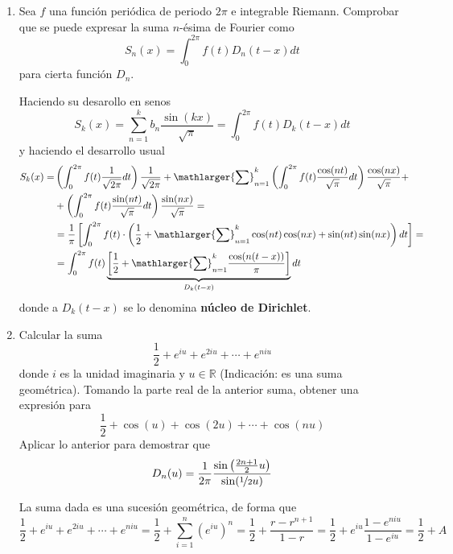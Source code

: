 \begin{enumerate}
    \item Sea $f$ una función periódica de periodo $2\pi$ e integrable Riemann. Comprobar que se puede expresar la suma $n$-ésima de Fourier como $$S_n(x) = \int_0^{2\pi} f(t) D_n(t - x) dt$$ para cierta función $D_n$.
    \begin{sol}
        Haciendo su desarollo en senos
        $$S_k(x)=\sum_{n=1}^k b_n \dfrac{\sin(kx)}{\sqrt{\pi}}=\int_0^{2\pi} f(t) D_k(t-x) dt$$
        y haciendo el desarrollo usual
        \begin{equation*}\begin{split} S_k(x)=&\left(\int_0^{2\pi} f(t) \dfrac{1}{\sqrt{2\pi}} dt\right)\dfrac{1}{\sqrt{2\pi}} + \mathlarger{\sum}_{n=1}^k \left(\int_0^{2\pi} f(t) \dfrac{\cos(nt)}{\sqrt{\pi}} dt \right)\dfrac{\cos(nx)}{\sqrt{\pi}} +\\
        &+\left(\int_0^{2\pi} f(t) \dfrac{\sin(nt)}{\sqrt{\pi}} dt \right)\dfrac{\sin(nx)}{\sqrt{\pi}}= \\
        &=\dfrac{1}{\pi} \left[ \int_0^{2\pi} f(t) \cdot \left(\dfrac{1}{2}+ \mathlarger{\sum}_{n=1}^k \cos(nt) \cos(nx) + \sin(nt) \sin (nx) \right)dt \right] = \\
        & = \int_0^{2\pi} f(t) \underbrace{\left[\dfrac{1}{2}+ \mathlarger{\sum}_{n=1}^k \dfrac{\cos(n(t-x))}{\pi} \right]}_{D_k(t-x)} dt
        \end{split}
        \end{equation*}
        donde a $D_k(t-x)$ se lo denomina \textbf{núcleo de Dirichlet}.
    \end{sol}
    \item Calcular la suma 
    $$\dfrac{1}{2} + e^{iu} + e^{2iu } + \cdots  + e^{niu}$$ 
    donde $i$ es la unidad imaginaria y $u \in \mathbb R$ (Indicación: es una suma geométrica). Tomando la parte real de la anterior suma, obtener una expresión para
     $$\dfrac{1}{2} +  \cos(u) + \cos(2u) + \cdots + \cos(nu)$$ 
    Aplicar lo anterior para demostrar que
    $$D_n(u) = \dfrac{1}{2\pi} \dfrac{\sin\left(\frac{2n+1}{2}u\right)}{\sin(\nicefrac{1}{2}u)}$$
    \begin{sol}
     La suma dada es una sucesión geométrica, de forma que 
     $$\dfrac{1}{2}+ e^{iu} + e^{2iu } + \cdots  + e^{niu} = \dfrac{1}{2}+ \sum_{i=1}^n (e^{iu})^n= \dfrac{1}{2}+ \dfrac{r-r^{n+1}}{1-r}=\dfrac{1}{2}+ e^{iu} \dfrac{1-e^{niu}}{1-e^{iu}} = \dfrac{1}{2}+ A$$

\end{sol}
\end{enumerate}
